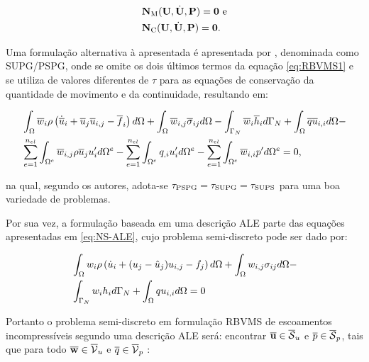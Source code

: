 \documentclass[_ArquivoPrincipal.tex]{subfiles}
\begin{document}
\begin{subequations}
    \begin{align}
         & \mathbf{N}_\mathrm{M}(\mathbf{U},\dot{\mathbf{U}},\mathbf{P})=\mathbf{0}\text{ e} \\
         & \mathbf{N}_\mathrm{C}(\mathbf{U},\dot{\mathbf{U}},\mathbf{P})=\mathbf{0}\text{.}
    \end{align}
\end{subequations}

Uma formulação alternativa à apresentada é apresentada por , denominada como SUPG/PSPG, onde se omite os dois últimos termos da equação \ref{eq:RBVMS1} e se utiliza de valores diferentes de $\tau$ para as equações de conservação da quantidade de movimento e da continuidade, resultando em:

\begin{equation}
    \begin{split}
        &\int_{\Omega}{\overline{w}_i\rho\left({\dot{\overline{u}}_i+\overline{u}_j\overline{u}_{i,j}-\overline{f}_i}\right) d\Omega}+\int_{\Omega}{\overline{w}_{i,j}\overline{\sigma}_{ij} d\Omega}-\int_{\Gamma_N}{\overline{w}_i\overline{h}_i d\Gamma_N}+\int_{\Omega}{\overline{q}\overline{u}_{i,i} d\Omega}-\\
        &\sum_{e=1}^{n_{el}}{\int_{\Omega^e}{\overline{w}_{i,j}\rho\overline{u}_ju'_i d\Omega^e}}-\sum_{e=1}^{n_{el}}{\int_{\Omega^e}{q_{,i}u'_i d\Omega^e}}-\sum_{e=1}^{n_{el}}{\int_{\Omega^e}{\overline{w}_{i,i}p' d\Omega^e}}=0
        \text{,}
        \label{eq:SUPG-PSPG}
    \end{split}
\end{equation}

\noindent na qual, segundo os autores, adota-se $\tau_{\mathrm{PSPG}}=\tau_{\mathrm{SUPG}}=\tau_{\mathrm{SUPS}}$ para uma boa variedade de problemas.

Por sua vez, a formulação baseada em uma descrição ALE parte das equações apresentadas em \ref{eq:NS-ALE}, cujo problema semi-discreto pode ser dado por:

\begin{equation}
    \begin{split}
        &\int_{\Omega}{w_i\rho\left({\dot{u}_i+(u_j-\hat{u}_j)u_{i,j}-f_j}\right) d\Omega}+\int_{\Omega}{w_{i,j}\sigma_{ij} d\Omega}-\\
        &\int_{\Gamma_N}{w_ih_i d\Gamma_N}+\int_{\Omega}{qu_{i,i} d\Omega}=0
    \end{split}
\end{equation}

Portanto o problema semi-discreto em formulação RBVMS de escoamentos incompressíveis segundo uma descrição ALE será: encontrar $\overline{\mathbf{u}}\in\overline{\mathcal{S}}_u$ e $\overline{p}\in\overline{\mathcal{S}}_p$, tais que para todo $\overline{\mathbf{w}}\in\overline{\mathcal{V}}_u$ e $\overline{q}\in\overline{\mathcal{V}}_p$ \cite{bazilevs2013computational}:
\end{document}
